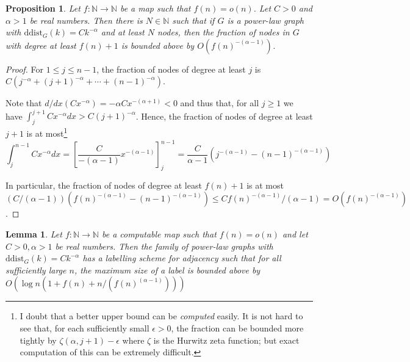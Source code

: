 \documentclass{article}
\newtheorem{proposition}{Proposition}
\newtheorem{lemma}{Lemma}
\begin{document}
\begin{proposition}\label{prop:smallfraction}
Let $f : \mathbb{N} \longrightarrow \mathbb{N}$ be a map such that
$f(n) = o(n)$. Let $C > 0$ and $\alpha > 1$ be real numbers. Then
there is $N \in \mathbb{N}$ such that if $G$ is a power-law graph with $\mathrm{ddist}_G(k) = C k^{-\alpha}$
and at least $N$ nodes, then the fraction of nodes in $G$ with degree at least $f(n) + 1$
is bounded above by $O(f(n)^{-(\alpha-1)})$.
\end{proposition}

\begin{proof}
For $1 \leq j \leq n - 1$, the fraction of nodes of degree at least $j$
is $C (j^{-\alpha} + (j+1)^{-\alpha} + \cdots + (n-1)^{-\alpha})$.

Note that $d/dx (Cx^{-\alpha}) =  -\alpha C x^{-(\alpha + 1)} < 0$
and thus that, for all $j \geq 1$ we have $\int_{j}^{j+1} Cx^{-\alpha} dx > C(j+1)^{-\alpha}$.
Hence, the fraction of nodes of degree at least $j+1$ is at most\footnote{I doubt that a better upper bound can be \emph{computed} easily. It is not hard to see that, for each sufficiently small $\epsilon > 0$, the fraction can be bounded more tightly by $\zeta(\alpha,j+1) - \epsilon$ where $\zeta$ is the Hurwitz zeta function; but exact
computation of this can be extremely difficult.}
$$
\int_j^{n-1} C x^{-\alpha} dx = \left[ \frac{C}{-(\alpha - 1)} x^{-(\alpha-1)} \right]_j^{n-1}
= \frac{C}{\alpha - 1}\left(j^{-(\alpha - 1)} - (n-1)^{-(\alpha -1 )} \right)
$$

In particular, the fraction of nodes of degree at least $f(n) + 1$ is at most
 $(C/(\alpha - 1))\left(f(n)^{-(\alpha - 1)} - (n-1)^{-(\alpha -1 )} \right)
\leq C f(n)^{-(\alpha - 1)}/(\alpha - 1) = O(f(n)^{-(\alpha - 1)})$.
\end{proof}


\begin{lemma}\label{lem:silly_bound}
Let $f : \mathbb{N} \longrightarrow \mathbb{N}$ be a computable map such that $f(n) = o(n)$
and let $C > 0, \alpha > 1$ be real numbers. Then the family of power-law graphs
with $\mathrm{ddist}_G(k) = C k^{-\alpha}$ has a labelling scheme for adjacency
such that for all sufficiently large $n$, the maximum size of a label
is bounded above by $O(\log n (1 + f(n) + n/(f(n)^{(\alpha - 1)})))$
\end{lemma}
\end{document}
